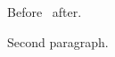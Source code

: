 \documentclass{article}
\begin{document}
Before \edef\x{\the\lxtwa\the\lxtwb}\x\ after.

Second paragraph.
\end{document}

